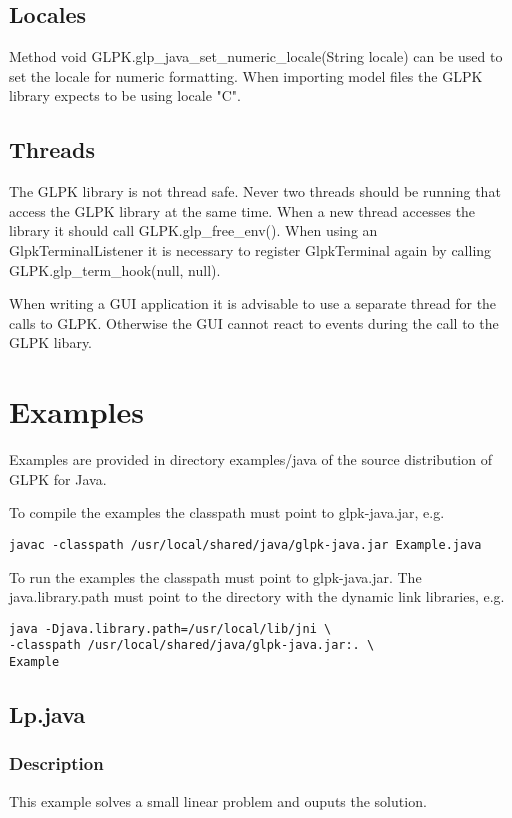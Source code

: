 \documentclass[a4paper,11pt]{report}
\begin{document}
\section{Locales}
Method void GLPK.glp\_java\_set\_numeric\_locale(String locale) can be used to
set the locale for numeric formatting. When importing model files the GLPK
library expects to be using locale "C".

\section{Threads}
The GLPK library is not thread safe. Never two threads should be running that
access the GLPK library at the same time. When a new thread accesses the
library it should call GLPK.glp\_free\_env(). When using an GlpkTerminalListener
it is necessary to register GlpkTerminal again by calling
\linebreak GLPK.glp\_term\_hook(null, null).

When writing a GUI application it is advisable to use a separate thread for
the calls to GLPK. Otherwise the GUI cannot react to events during the call
to the GLPK libary.

\chapter{Examples}

Examples are provided in directory examples/java of the source distribution of
GLPK for Java.

To compile the examples the classpath must point to glpk-java.jar, e.g.
\begin{verbatim}
javac -classpath /usr/local/shared/java/glpk-java.jar Example.java
\end{verbatim}
To run the examples the classpath must point to glpk-java.jar. The java.library.path
must point to the directory with the dynamic link libraries, e.g.
\begin{verbatim}
java -Djava.library.path=/usr/local/lib/jni \
-classpath /usr/local/shared/java/glpk-java.jar:. \
Example
\end{verbatim}

\section{Lp.java}

\subsection{Description}
This example solves a small linear problem and ouputs the solution.
\end{document}
